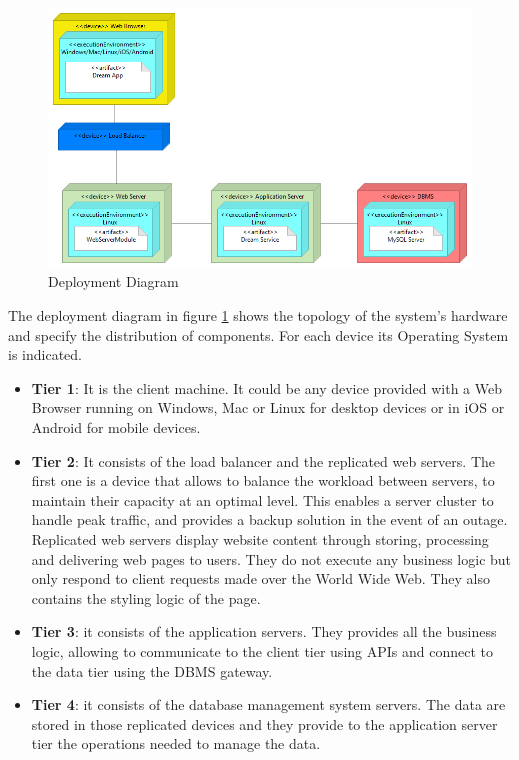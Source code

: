 \begin{figure}[h!]
        \centering
        \includegraphics[scale=0.40]{images/deployment_view.png}
        \caption{Deployment Diagram}
        \label{fig:deployement_diagram}
\end{figure}
\FloatBarrier

The deployment diagram in figure \ref{fig:deployement_diagram} shows the topology of the system's hardware and specify the distribution of components. For each device its Operating System is indicated.
\begin{itemize}
    \item \textbf{Tier 1}: It is the client machine. It could be any device provided with a Web Browser running on Windows, Mac or Linux for desktop devices or in iOS or Android for mobile devices.
    \item \textbf{Tier 2}: It consists of the load balancer and the replicated web servers. The first one is a device that allows to balance the workload between servers, to maintain their capacity at an optimal level. This enables a server cluster to handle peak traffic, and provides a backup solution in the event of an outage.
    \\Replicated web servers display website content through storing, processing and delivering web pages to users. They do not execute any business logic but only respond to client requests made over the World Wide Web. They also contains the styling logic of the page.
    \item \textbf{Tier 3}: it consists of the application servers. They provides all the business logic, allowing to communicate to the client tier using APIs and connect to the data tier using the DBMS gateway.
    \item \textbf{Tier 4}: it consists of the database management system servers. The data are stored in those replicated devices and they provide to the application server tier the operations needed to manage the data.
\end{itemize}
